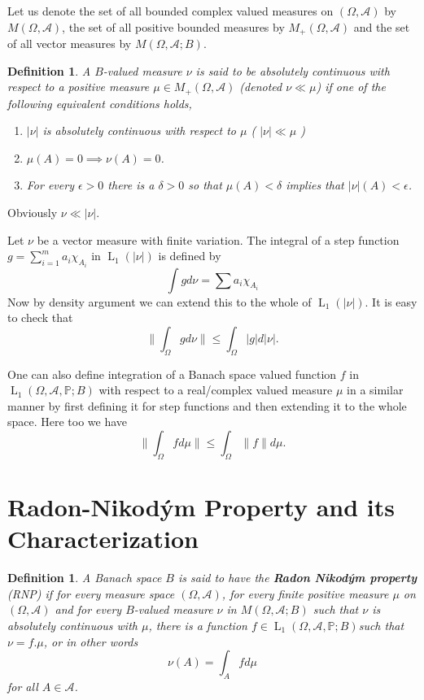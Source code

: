 \documentclass[]{report}
\newcommand{\lp}[2]{\operatorname{L}_{#1}({#2})}
\newcommand*{\Normu}[1]{\lVert {#1} \rVert}
\newcommand*{\Abs}[1]{\lvert {#1} \rvert}
\newcommand{\pspc}{\Omega,\mathcal{A},\mathbb{P}}
\newtheorem{Def}[theorem]{Definition}
\begin{document}
Let us denote the set of all bounded complex valued measures on $(\Omega,\mathcal{A})$ by $M(\Omega,\mathcal{A})$, the set of all positive bounded measures by $M_+(\Omega,\mathcal{A})$ and the set of all vector measures by $M(\Omega,\mathcal{A};B)$.

\begin{Def}
	A $B$-valued measure $\nu$ is said to be absolutely continuous with respect to a positive measure $\mu \in M_+(\Omega,\mathcal{A})$ (denoted $\nu \ll \mu$) if one of the following equivalent conditions holds,
	\begin{enumerate}
		\item $\Abs{\nu}$ is absolutely continuous with respect to $\mu$ ( $\Abs{\nu} \ll \mu$ )
		\item $\mu(A)=0 \implies \nu(A)=0$.
		\item For every $\epsilon>0$ there is a $\delta>0$ so that $\mu(A)<\delta$ implies that $\Abs{\nu}(A)<\epsilon$. 
	\end{enumerate}
\end{Def}
Obviously $\nu \ll \Abs{\nu}$.


Let $\nu$ be a vector measure with finite variation. The integral of a step function $g= \sum_{i=1}^{m}a_i\chi_{A_i}$ in $\lp{1}{\Abs{\nu}}$ is defined by \[ \int g d\nu= \sum a_i\chi_{A_i} \]
Now by density argument we can extend this to the whole of $\lp{1}{\Abs{\nu}}$. It is easy to check that \[ \Normu{\int_{\Omega}g d\nu} \leq \int_{\Omega}|g| d|\nu| . \]

One can also define integration of a Banach space valued function $f$ in $\lp{1}{\pspc;B}$ with respect to a real/complex valued measure $\mu$ in a similar manner by first defining it for step functions and then extending it to the whole space. Here too we have \[ \Normu{\int_{\Omega}f d\mu} \leq \int_{\Omega}\Normu{f} d\mu . \]

\section{Radon-Nikod\'ym Property and its Characterization}
\begin{Def}
	A Banach space $B$ is said to have the \textbf{Radon Nikod\'ym property }(RNP) if for every measure space $(\Omega,\mathcal{A})$, for every finite positive measure $\mu$ on $(\Omega,\mathcal{A})$ and for every $B$-valued measure $\nu$ in $M(\Omega,\mathcal{A};B)$ such that $\nu$ is absolutely continuous with $\mu$, there is a function $f \in \lp{1}{\pspc;B}$such that $\nu=f.\mu$, or in other words 
	\[ \nu(A)=\int_{A}fd\mu \] for all $A \in \mathcal{A}$.
\end{Def}
\end{document}
